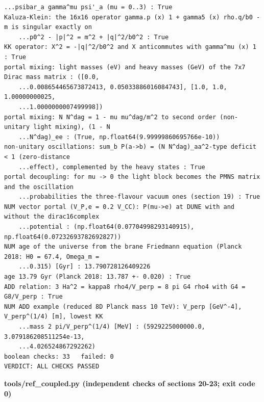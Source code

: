 \documentclass[10pt,a4paper]{article}
\begin{document}
\begin{Verbatim}[fontsize=\small,frame=single,framesep=2mm]
    ...psibar_a gamma^mu psi'_a (mu = 0..3) : True
Kaluza-Klein: the 16x16 operator gamma.p (x) 1 + gamma5 (x) rho.q/b0 - m is singular exactly on
    ...p0^2 - |p|^2 = m^2 + |q|^2/b0^2 : True
KK operator: X^2 = -|q|^2/b0^2 and X anticommutes with gamma^mu (x) 1 : True
portal mixing: light masses (eV) and heavy masses (GeV) of the 7x7 Dirac mass matrix : ([0.0,
    ...0.008654465673872413, 0.05033886016084743], [1.0, 1.0, 1.00000000025,
    ...1.0000000007499998])
portal mixing: N N^dag = 1 - mu mu^dag/m^2 to second order (non-unitary light mixing), (1 - N
    ...N^dag)_ee : (True, np.float64(9.99999860695766e-10))
non-unitary oscillations: sum_b P(a->b) = (N N^dag)_aa^2-type deficit < 1 (zero-distance
    ...effect), complemented by the heavy states : True
portal decoupling: for mu -> 0 the light block becomes the PMNS matrix and the oscillation
    ...probabilities the three-flavour vacuum ones (section 19) : True
NUM vector portal (V_P,e = 0.2 V_CC): P(mu->e) at DUNE with and without the dirac16complex
    ...potential : (np.float64(0.07704998293140915), np.float64(0.07232693782692827))
NUM age of the universe from the brane Friedmann equation (Planck 2018: H0 = 67.4, Omega_m =
    ...0.315) [Gyr] : 13.790728126409226
age 13.79 Gyr (Planck 2018: 13.787 +- 0.020) : True
ADD relation: 3 Ha^2 = kappa8 rho4/V_perp = 8 pi G4 rho4 with G4 = G8/V_perp : True
NUM ADD example (reduced 8D Planck mass 10 TeV): V_perp [GeV^-4], V_perp^(1/4) [m], lowest KK
    ...mass 2 pi/V_perp^(1/4) [MeV] : (5929225000000.0, 3.079186208511254e-13,
    ...4.026524867292262)
boolean checks: 33   failed: 0
VERDICT: ALL CHECKS PASSED
\end{Verbatim}
\textbf{tools/ref\_coupled.py (independent checks of sections 20-23; exit code 0)}
\end{document}
